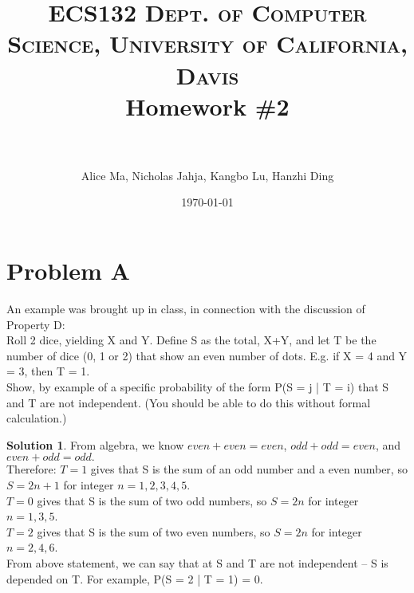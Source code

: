 \documentclass[paper=a4, fontsize=11pt]{scrartcl} %
\title{	
\normalfont \normalsize 
\textsc{ECS132 \hfill Dept. of Computer Science, University of California, Davis} %
\horrule{0.5pt} \\[0.4cm] %
\huge Homework \#2 \\ %
\horrule{2pt} \\[0.5cm] %
}
\author{Alice Ma, Nicholas Jahja, Kangbo Lu, Hanzhi Ding} %
\date{\today}
\numberwithin{equation}{section} %
\numberwithin{figure}{section} %
\numberwithin{table}{section} %
\theoremstyle{definition}
\newtheorem*{solution}{Solution}
\begin{document}
\maketitle

\section{Problem A}
    An example was brought up in class, in connection with the discussion of Property D:\\
    Roll 2 dice, yielding X and Y. Define S as the total, X+Y, and let T be the number of dice (0, 1 or 2) that show an even number of dots. E.g. if X = 4 and Y = 3, then T = 1.\\
    
    Show, by example of a specific probability of the form P(S = j | T = i) that S and T are not independent. (You should be able to do this without formal calculation.)
    \begin{solution}
    From algebra, we know $even + even = even$, $odd + odd = even$, and $even + odd = odd.$\\
    Therefore: $T = 1$ gives that S is the sum of an odd number and a even number, so $S = 2n + 1$ for integer $n = 1, 2, 3, 4, 5$. \\
    $T = 0$ gives that S is the sum of two odd numbers, so $S = 2n$ for integer $n = 1, 3, 5$. \\
    $T = 2$ gives that S is the sum of two even numbers, so $S = 2n$ for integer $n = 2, 4, 6$.\\
    From above statement, we can say that at S and T are not independent -- S is depended on T. For example, P(S = 2 | T = 1) = 0.
    \end{solution}
    
\end{document}
